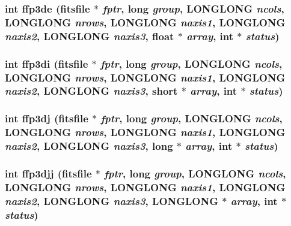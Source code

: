 \subsubsection{\setlength{\rightskip}{0pt plus 5cm}int ffp3de (\bf{fitsfile} $\ast$ {\em fptr}, long {\em group}, \bf{LONGLONG} {\em ncols}, \bf{LONGLONG} {\em nrows}, \bf{LONGLONG} {\em naxis1}, \bf{LONGLONG} {\em naxis2}, \bf{LONGLONG} {\em naxis3}, float $\ast$ {\em array}, int $\ast$ {\em status})}\label{src_2fitsio_8h_47bab14919cfc2b7d34df2117c7dfdaa}


\subsubsection{\setlength{\rightskip}{0pt plus 5cm}int ffp3di (\bf{fitsfile} $\ast$ {\em fptr}, long {\em group}, \bf{LONGLONG} {\em ncols}, \bf{LONGLONG} {\em nrows}, \bf{LONGLONG} {\em naxis1}, \bf{LONGLONG} {\em naxis2}, \bf{LONGLONG} {\em naxis3}, short $\ast$ {\em array}, int $\ast$ {\em status})}\label{src_2fitsio_8h_61b77356b3271c147b6d8cef61a762ab}


\subsubsection{\setlength{\rightskip}{0pt plus 5cm}int ffp3dj (\bf{fitsfile} $\ast$ {\em fptr}, long {\em group}, \bf{LONGLONG} {\em ncols}, \bf{LONGLONG} {\em nrows}, \bf{LONGLONG} {\em naxis1}, \bf{LONGLONG} {\em naxis2}, \bf{LONGLONG} {\em naxis3}, long $\ast$ {\em array}, int $\ast$ {\em status})}\label{src_2fitsio_8h_282e156fee640697324c7fcb6c5f1edf}


\subsubsection{\setlength{\rightskip}{0pt plus 5cm}int ffp3djj (\bf{fitsfile} $\ast$ {\em fptr}, long {\em group}, \bf{LONGLONG} {\em ncols}, \bf{LONGLONG} {\em nrows}, \bf{LONGLONG} {\em naxis1}, \bf{LONGLONG} {\em naxis2}, \bf{LONGLONG} {\em naxis3}, \bf{LONGLONG} $\ast$ {\em array}, int $\ast$ {\em status})}\label{src_2fitsio_8h_4b7964ba335cd471910d79a4055aeb1d}


